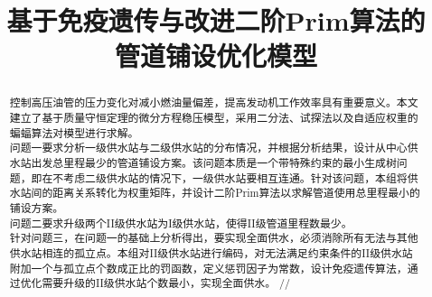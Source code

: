 \documentclass{whutmod}
\title{基于免疫遗传与改进二阶Prim算法的\\管道铺设优化模型}
\begin{document}
	\maketitle
	\thispagestyle{empty}
	\begin{abstract}
		控制高压油管的压力变化对减小燃油量偏差，提高发动机工作效率具有重要意义。本文建立了基于质量守恒定理的微分方程稳压模型，采用二分法、试探法以及自适应权重的蝙蝠算法对模型进行求解。
		\\
	
	    问题一要求分析一级供水站与二级供水站的分布情况，并根据分析结果，设计从中心供水站出发总里程最少的管道铺设方案。该问题本质是一个带特殊约束的最小生成树问题，即在不考虑二级供水站的情况下，一级供水站要相互连通。针对该问题，本组将供水站间的距离关系转化为权重矩阵，并设计二阶Prim算法以求解管道使用总里程最小的铺设方案。
		\\
		
		问题二要求升级两个II级供水站为I级供水站，使得II级管道里程数最少。
		\\
		
		针对问题三，在问题一的基础上分析得出，要实现全面供水，必须消除所有无法与其他供水站相连的孤立点。本组对II级供水站进行编码，对无法满足约束条件的II级供水站附加一个与孤立点个数成正比的罚函数，定义惩罚因子为常数，设计免疫遗传算法，通过优化需要升级的II级供水站个数最小，实现全面供水。
		//
	

\end{abstract}
\end{document}

